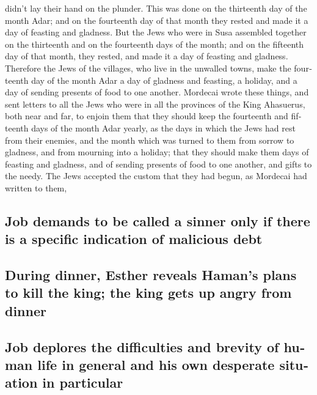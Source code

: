 \begin{paracol}{2}
\begin{otherlanguage}{english}
didn't lay their hand on the plunder.  This was done on
the thirteenth day of the month Adar; and on the fourteenth day of that
month they rested and made it a day of feasting and gladness.
 But the Jews who were in Susa assembled together on the
thirteenth and on the fourteenth days of the month; and on the fifteenth
day of that month, they rested, and made it a day of feasting and
gladness.  Therefore the Jews of the villages, who live
in the unwalled towns, make the fourteenth day of the month Adar a day
of gladness and feasting, a holiday, and a day of sending presents of
food to one another.  Mordecai wrote these things, and
sent letters to all the Jews who were in all the provinces of the King
Ahasuerus, both near and far,  to enjoin them that they
should keep the fourteenth and fifteenth days of the month Adar yearly,
 as the days in which the Jews had rest from their
enemies, and the month which was turned to them from sorrow to gladness,
and from mourning into a holiday; that they should make them days of
feasting and gladness, and of sending presents of food to one another,
and gifts to the needy.  The Jews accepted the custom
that they had begun, as Mordecai had written to them,

\hypertarget{job-demands-to-be-called-a-sinner-only-if-there-is-a-specific-indication-of-malicious-debt}{%
\subsection{Job demands to be called a sinner only if there is a
specific indication of malicious
debt}\label{job-demands-to-be-called-a-sinner-only-if-there-is-a-specific-indication-of-malicious-debt}}

\hypertarget{during-dinner-esther-reveals-hamans-plans-to-kill-the-king-the-king-gets-up-angry-from-dinner}{%
\subsection{During dinner, Esther reveals Haman's plans to kill the
king; the king gets up angry from
dinner}\label{during-dinner-esther-reveals-hamans-plans-to-kill-the-king-the-king-gets-up-angry-from-dinner}}

\hypertarget{job-deplores-the-difficulties-and-brevity-of-human-life-in-general-and-his-own-desperate-situation-in-particular}{%
\subsection{Job deplores the difficulties and brevity of human life in
general and his own desperate situation in
particular}\label{job-deplores-the-difficulties-and-brevity-of-human-life-in-general-and-his-own-desperate-situation-in-particular}}


\end{otherlanguage}
\end{paracol}
